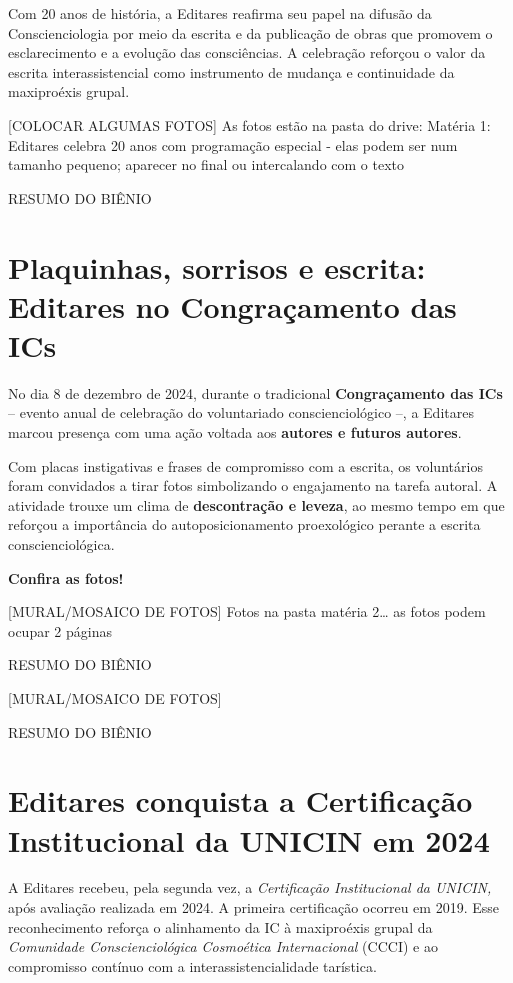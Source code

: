 \documentclass[
]{article}
\begin{document}
Com 20 anos de história, a Editares reafirma seu papel na difusão da Conscienciologia por meio da escrita e da publicação de obras que promovem o esclarecimento e a evolução das consciências. A celebração reforçou o valor da escrita interassistencial como instrumento de mudança e continuidade da maxiproéxis grupal.

{[}COLOCAR ALGUMAS FOTOS{]} As fotos estão na pasta do drive: Matéria 1: Editares celebra 20 anos com programação especial - elas podem ser num tamanho pequeno; aparecer no final ou intercalando com o texto

RESUMO DO BIÊNIO

\section{Plaquinhas, sorrisos e escrita: Editares no Congraçamento das ICs}\label{plaquinhas-sorrisos-e-escrita-editares-no-congrauxe7amento-das-ics}

No dia 8 de dezembro de 2024, durante o tradicional \textbf{Congraçamento das ICs} -- evento anual de celebração do voluntariado conscienciológico --, a Editares marcou presença com uma ação voltada aos \textbf{autores e futuros autores}.

Com placas instigativas e frases de compromisso com a escrita, os voluntários foram convidados a tirar fotos simbolizando o engajamento na tarefa autoral. A atividade trouxe um clima de \textbf{descontração e leveza}, ao mesmo tempo em que reforçou a importância do autoposicionamento proexológico perante a escrita conscienciológica.

\textbf{Confira as fotos!}

{[}MURAL/MOSAICO DE FOTOS{]} Fotos na pasta matéria 2\ldots{} as fotos podem ocupar 2 páginas

RESUMO DO BIÊNIO

{[}MURAL/MOSAICO DE FOTOS{]}

RESUMO DO BIÊNIO

\section{Editares conquista a Certificação Institucional da UNICIN em 2024}\label{editares-conquista-a-certificauxe7uxe3o-institucional-da-unicin-em-2024}

A Editares recebeu, pela segunda vez, a \emph{Certificação Institucional da UNICIN,} após avaliação realizada em 2024. A primeira certificação ocorreu em 2019. Esse reconhecimento reforça o alinhamento da IC à maxiproéxis grupal da \emph{Comunidade Conscienciológica Cosmoética Internacional} (CCCI) e ao compromisso contínuo com a interassistencialidade tarística.
\end{document}

